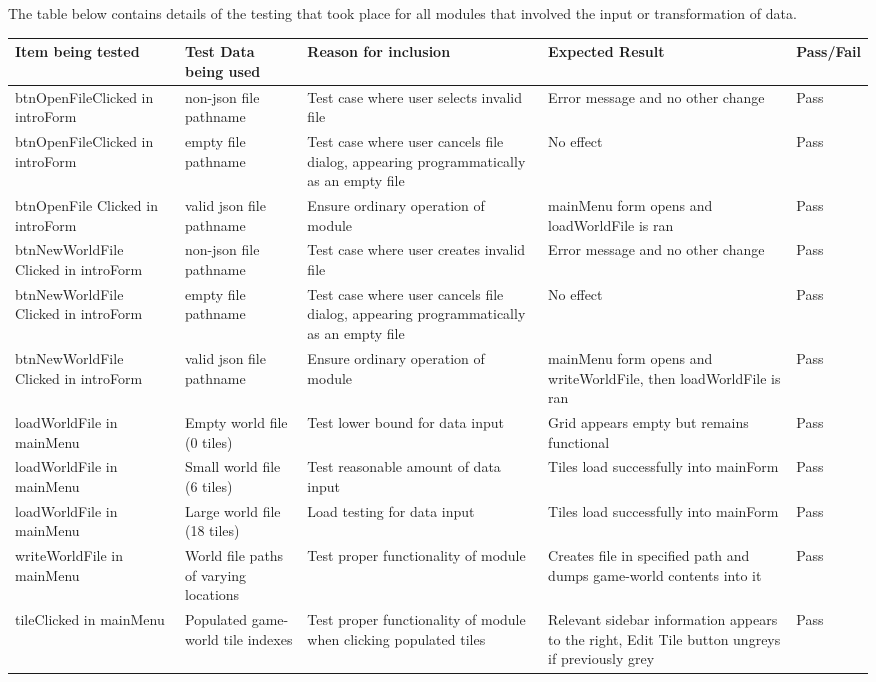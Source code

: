 \documentclass{article} \usepackage[margin=1in,headheight=57pt,headsep=0.1in]{geometry}
\begin{document}
The table below contains details of the testing that took place for all modules that involved the input or transformation of data. \\
\begin{center}
	\begin{longtable}[H]{|p{2.9cm}|p{2.9cm}|p{2.9cm}|p{2.9cm}|p{2.9cm}|} \hline
		Item being tested & Test Data being used & Reason for inclusion & Expected Result & Pass/Fail \\ \hline
		btnOpenFileClicked in introForm & non-json file pathname & Test case where user selects invalid file & Error message and no other change & Pass \\ \hline
		btnOpenFileClicked in introForm & empty file pathname & Test case where user cancels file dialog, appearing programmatically as an empty file & No effect & Pass \\ \hline
		btnOpenFile Clicked in introForm & valid json file pathname & Ensure ordinary operation of module & mainMenu form opens and loadWorldFile is ran & Pass \\ \hline
		btnNewWorldFile Clicked in introForm & non-json file pathname & Test case where user creates invalid file & Error message and no other change & Pass \\ \hline
		btnNewWorldFile Clicked in introForm & empty file pathname & Test case where user cancels file dialog, appearing programmatically as an empty file & No effect & Pass \\ \hline
		btnNewWorldFile Clicked in introForm & valid json file pathname & Ensure ordinary operation of module & mainMenu form opens and writeWorldFile, then loadWorldFile is ran & Pass \\ \hline
		loadWorldFile in mainMenu & Empty world file (0 tiles) & Test lower bound for data input & Grid appears empty but remains functional & Pass \\ \hline
		loadWorldFile in mainMenu & Small world file (6 tiles) & Test reasonable amount of data input & Tiles load successfully into mainForm & Pass \\ \hline
		loadWorldFile in mainMenu & Large world file (18 tiles) & Load testing for data input & Tiles load successfully into mainForm & Pass \\ \hline
		writeWorldFile in mainMenu & World file paths of varying locations & Test proper functionality of module & Creates file in specified path and dumps game-world contents into it & Pass \\ \hline
		tileClicked in mainMenu & Populated game-world tile indexes & Test proper functionality of module when clicking populated tiles & Relevant sidebar information appears to the right, Edit Tile button ungreys if previously grey & Pass \\ \hline

\end{longtable}
\end{center}
\end{document}
